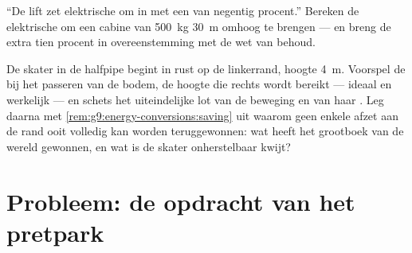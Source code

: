 \begin{exercise}[$\star\star$]\label{exo:g9:energy-conversions:11}
``De lift zet elektrische  om in
 met een  van negentig
procent.'' Bereken de elektrische  om een cabine van
\qty{500}{kg} \qty{30}{m} omhoog te brengen --- en breng de extra tien
procent in overeenstemming met de wet van behoud.
\end{exercise}

\begin{exercise}[$\star\star\star$]\label{exo:g9:energy-conversions:12}
De skater in de halfpipe begint in rust op de linkerrand, hoogte
\qty{4}{m}. Voorspel de  bij het passeren van de bodem,
de hoogte die rechts wordt bereikt --- ideaal en werkelijk --- en schets
het uiteindelijke lot van de beweging en van haar
. Leg daarna met
\cref{rem:g9:energy-conversions:saving} uit waarom geen enkele afzet aan
de rand ooit volledig kan worden teruggewonnen: wat heeft het grootboek
van de wereld gewonnen, en wat is de skater onherstelbaar kwijt?
\end{exercise}

\section{Probleem: de opdracht van het pretpark}

